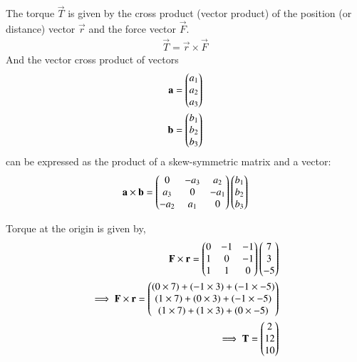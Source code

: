The torque $\vec{T}$ is given by the cross product (vector product) of the position (or distance) vector $\vec{r}$  and the force vector $\vec{F}$.
\begin{align}
    \vec{T} = {\vec{r}  \times  \vec{F}}
\end{align}
And the vector cross product of vectors 
\begin{align}
\mathbf{a} = \begin{pmatrix}  a_1 \\  a_2 \\ a_3\end{pmatrix}
\\
\mathbf{b} = \begin{pmatrix}  b_1 \\  b_2  \\ b_3\end{pmatrix}
\end{align}
can be expressed as the product of a skew-symmetric matrix and a vector:
\begin{align}
\mathbf{a \times b} = \begin{pmatrix}0 & -a_3 & a_2\\ a_3& 0 &-a_1 \\ -a_2 & a_1 & 0 \end{pmatrix} \begin{pmatrix}b_1\\b_2\\b_3\end{pmatrix}    
\end{align}

Torque at the origin is given by,
\begin{align}
\mathbf{F \times r} = \begin{pmatrix}0 & -1 & -1\\ 1& 0 &-1 \\ 1 & 1 & 0 \end{pmatrix} \begin{pmatrix}7\\3\\-5\end{pmatrix}  
\\
\implies\mathbf{F \times r} = \begin{pmatrix}(0 \times 7)  +  (-1 \times 3)  +  (-1 \times -5)\\(1 \times 7)  +  (0 \times 3)  +  (-1 \times -5)\\(1 \times 7)  +  (1 \times 3)  + (0 \times -5)\end{pmatrix} 
\\
\implies \mathbf{T} = \begin{pmatrix}2 \\  12  \\ 10 \end{pmatrix}
\end{align}






